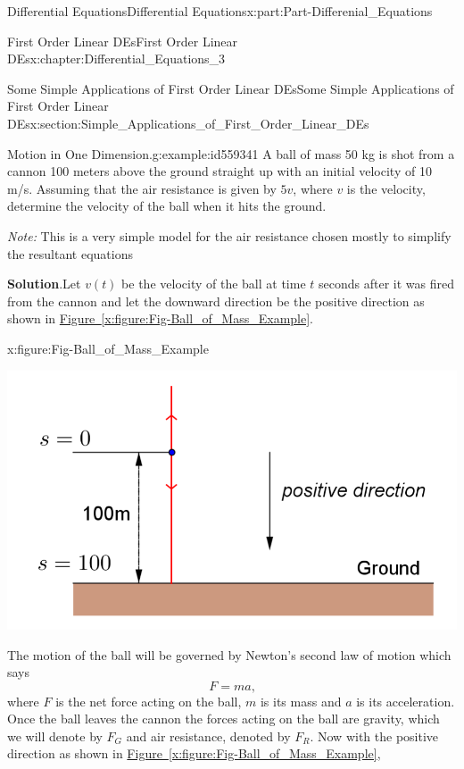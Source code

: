 \documentclass[oneside,10pt,]{book}
\newcommand{\blocktitlefont}{\relax}
\newcommand{\xreffont}{\relax}
\numberwithin{equation}{section}
\begin{document}
\begin{partptx}{Differential Equations}{}{Differential Equations}{}{}{x:part:Part-Differenial_Equations}
\begin{chapterptx}{First Order Linear DEs}{}{First Order Linear DEs}{}{}{x:chapter:Differential_Equations_3}
\begin{sectionptx}{Some Simple Applications of First Order Linear DEs}{}{Some Simple Applications of First Order Linear DEs}{}{}{x:section:Simple_Applications_of_First_Order_Linear_DEs}
\begin{example}{Motion in One Dimension.}{g:example:id559341}
A ball of mass 50 kg is shot from a cannon 100 meters above the ground straight up with an initial velocity of 10 m\slash{}s. Assuming that the air resistance is given by \(5v\), where \(v\) is the velocity, determine the velocity of the ball when it hits the ground.%
\par
\emph{Note:} This is a very simple model for the air resistance chosen mostly to simplify the resultant equations%
\par\smallskip%
\noindent\textbf{\blocktitlefont Solution}.\hypertarget{g:solution:id559388}{}\quad{}Let \(v(t)\) be the velocity of the ball at time \(t\) seconds after it was fired from the cannon and let the downward direction be the positive direction as shown in \hyperref[x:figure:Fig-Ball_of_Mass_Example]{Figure~{\xreffont\ref{x:figure:Fig-Ball_of_Mass_Example}}}.%
\begin{figureptx}{}{x:figure:Fig-Ball_of_Mass_Example}{}%
\begin{image}{0.15}{0.7}{0.15}%
\includegraphics[width=\linewidth]{./DifferentialEquations/Images/3/Fig2_ball_of_mass.png}
\end{image}%
\tcblower
\end{figureptx}%
The motion of the ball will be governed by Newton’s second law of motion which says%
\begin{equation*}
F = ma\text{,}
\end{equation*}
where \(F\) is the net force acting on the ball, \(m\) is its mass and \(a\) is its acceleration. Once the ball leaves the cannon the forces acting on the ball are gravity, which we will denote by \(F_G\) and air resistance, denoted by \(F_R\). Now with the positive direction as shown in \hyperref[x:figure:Fig-Ball_of_Mass_Example]{Figure~{\xreffont\ref{x:figure:Fig-Ball_of_Mass_Example}}},%
\begin{equation*}

\end{equation*}
\end{example}
\end{sectionptx}
\end{chapterptx}
\end{partptx}
\end{document}
